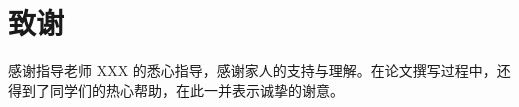 \documentclass[12pt,a4paper]{article}
\begin{document}
% 
% 

\clearpage
\section*{致谢}
感谢指导老师 XXX 的悉心指导，感谢家人的支持与理解。在论文撰写过程中，还得到了同学们的热心帮助，在此一并表示诚挚的谢意。

% 
\end{document}
